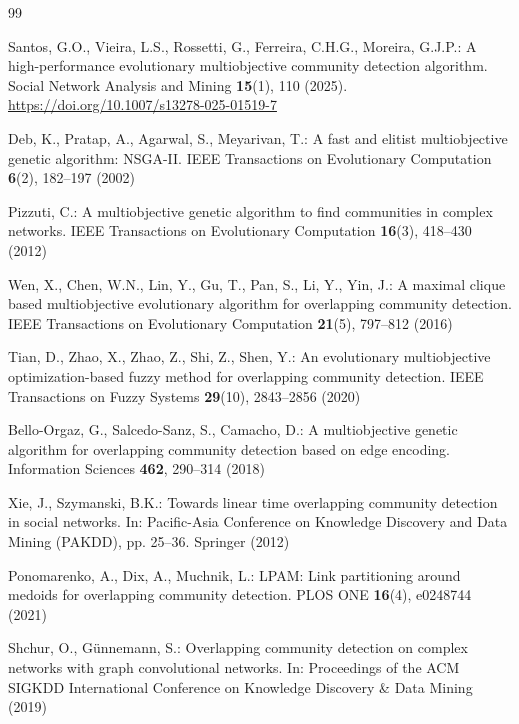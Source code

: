 \documentclass{svproc}
\begin{document}
\begin{thebibliography}{99}
\setlength{\itemsep}{-0.5pt}
\setlength{\parsep}{0pt}
\setlength{\parskip}{0pt}

Santos, G.O., Vieira, L.S., Rossetti, G., Ferreira, C.H.G., Moreira, G.J.P.: A high-performance evolutionary multiobjective community detection algorithm. Social Network Analysis and Mining \textbf{15}(1), 110 (2025). \url{https://doi.org/10.1007/s13278-025-01519-7}

Deb, K., Pratap, A., Agarwal, S., Meyarivan, T.: A fast and elitist multiobjective genetic algorithm: NSGA-II. IEEE Transactions on Evolutionary Computation \textbf{6}(2), 182--197 (2002)

Pizzuti, C.: A multiobjective genetic algorithm to find communities in complex networks. IEEE Transactions on Evolutionary Computation \textbf{16}(3), 418--430 (2012)

Wen, X., Chen, W.N., Lin, Y., Gu, T., Pan, S., Li, Y., Yin, J.: A maximal clique based multiobjective evolutionary algorithm for overlapping community detection. IEEE Transactions on Evolutionary Computation \textbf{21}(5), 797--812 (2016)

Tian, D., Zhao, X., Zhao, Z., Shi, Z., Shen, Y.: An evolutionary multiobjective optimization-based fuzzy method for overlapping community detection. IEEE Transactions on Fuzzy Systems \textbf{29}(10), 2843--2856 (2020)

Bello-Orgaz, G., Salcedo-Sanz, S., Camacho, D.: A multiobjective genetic algorithm for overlapping community detection based on edge encoding. Information Sciences \textbf{462}, 290--314 (2018)

Xie, J., Szymanski, B.K.: Towards linear time overlapping community detection in social networks. In: Pacific-Asia Conference on Knowledge Discovery and Data Mining (PAKDD), pp. 25--36. Springer (2012)

Ponomarenko, A., Dix, A., Muchnik, L.: LPAM: Link partitioning around medoids for overlapping community detection. PLOS ONE \textbf{16}(4), e0248744 (2021)

Shchur, O., G{\"u}nnemann, S.: Overlapping community detection on complex networks with graph convolutional networks. In: Proceedings of the ACM SIGKDD International Conference on Knowledge Discovery \& Data Mining (2019)


\end{thebibliography}
\end{document}
